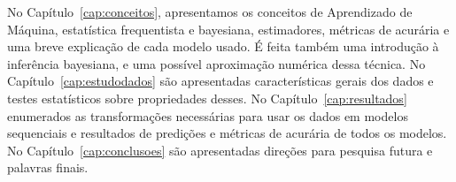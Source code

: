 No Capítulo~\ref{cap:conceitos}, apresentamos os conceitos de Aprendizado de
Máquina, estatística frequentista e bayesiana, estimadores, métricas de acurária
e uma breve explicação de cada modelo usado. É feita também uma introdução à inferência
bayesiana, e uma possível aproximação numérica dessa técnica. No
Capítulo~\ref{cap:estudodados} são apresentadas características gerais dos
dados e testes estatísticos sobre propriedades desses. No
Capítulo~\ref{cap:resultados} enumerados as transformações necessárias para usar
os dados em modelos sequenciais e resultados de predições e métricas de
acurária de todos os modelos. No Capítulo~\ref{cap:conclusoes} são apresentadas
direções para pesquisa futura e palavras finais. 



